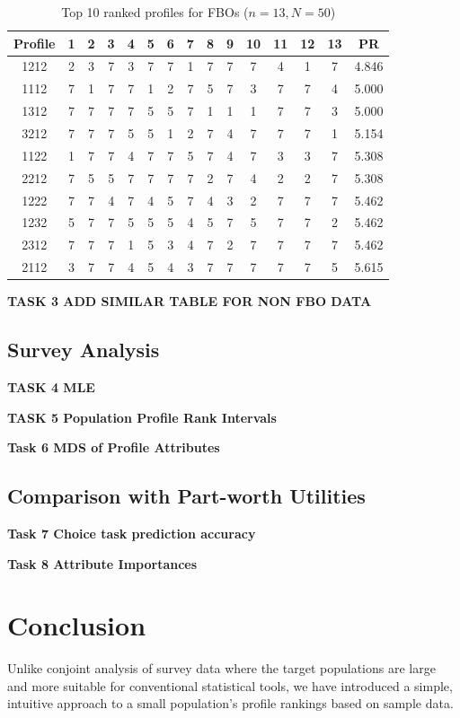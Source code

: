 \documentclass[a4paper, 12pt]{article}
\begin{document}
{\begin{table}[!htpb]
\scriptsize
\centering
\begin{tabular}{c|ccccc|ccccc|ccc|c}
Profile& 1 & 2 & 3 & 4 & 5 & 6&7&8&9&10&11&12&13&PR\\\hline
1212& 2&	3&	7&	3&	7&	7&	1&	7&	7&	7&	4&	1&	7&	4.846\\
1112&7	&1	&7	&7	&1	&2	&7	&5	&7	&3	&7	&7	&4	&5.000\\
1312&7	&7	&7	&7	&5	&5	&7	&1	&1	&1	&7	&7	&3	&5.000\\
3212&7	&7	&7	&5	&5	&1	&2	&7	&4	&7	&7	&7	&1	&5.154\\
1122&1	&7	&7	&4	&7	&7	&5	&7	&4	&7	&3	&3	&7	&5.308\\
2212&7	&5	&5	&7	&7	&7	&7	&2	&7	&4	&2	&2	&7	&5.308\\
1222&7	&7	&4	&7	&4	&5	&7	&4	&3	&2	&7	&7	&7	&5.462\\
1232&5	&7	&7	&5	&5	&5	&4	&5	&7	&5	&7	&7	&2	&5.462\\
2312&7	&7	&7	&1	&5	&3	&4	&7	&2	&7	&7	&7	&7	&5.462\\
2112&3	&7	&7	&4	&5	&4	&3	&7	&7	&7	&7	&7	&5	&5.615\\\hline
\end{tabular}
\caption{{\small Top 10 ranked profiles for FBOs ($n=13,N=50$) }   }
\label{Tab13}
\end{table}

{\bf TASK 3 ADD SIMILAR TABLE FOR NON FBO DATA}


\subsection{Survey Analysis}
{\bf TASK 4 MLE}



{\bf TASK 5 Population Profile Rank Intervals}



{\bf Task 6 MDS of Profile Attributes }


\subsection{Comparison with Part-worth Utilities}

{\bf Task 7 Choice task prediction accuracy}

{\bf Task 8 Attribute Importances}




\section{Conclusion}
Unlike conjoint analysis of survey data where the target populations are large and more suitable for conventional statistical tools, we have introduced a simple, intuitive approach to a small population's profile rankings based on sample data. 

}
\end{document}
